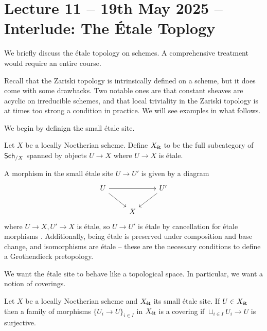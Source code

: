 \section{Lecture 11 -- 19th May 2025 -- Interlude: The \'{E}tale Toplogy}\label{sec: lecture 11}
We briefly discuss the \'{e}tale topology on schemes. A comprehensive treatment would require an entire course. 

Recall that the Zariski topology is intrinsically defined on a scheme, but it does come with some drawbacks. Two notable ones are that constant sheaves are acyclic on irreducible schemes, and that local triviality in the Zariski topology is at times too strong a condition in practice. We will see examples in what follows. 

We begin by definign the small \'{e}tale site. 
\begin{definition}\label{def: small etale site}
    Let $X$ be a locally Noetherian scheme. Define $X_{\mathsf{\acute{e}t}}$ to be the full subcategory of $\mathsf{Sch}_{/X}$ spanned by objects $U\to X$ where $U\to X$ is \'{e}tale. 
\end{definition}
\begin{remark}
    A morphism in the small \'{e}tale site $U\to U'$ is given by a diagram 
    $$%
    \begin{tikzcd}
        U && {U'} \\
        & X
        \arrow[from=1-1, to=1-3]
        \arrow[from=1-1, to=2-2]
        \arrow[from=1-3, to=2-2]
    \end{tikzcd}$$
    where $U\to X,U'\to X$ is \'{e}tale, so $U\to U'$ is \'{e}tale by cancellation for \'{e}tale morphisms \cite[\href{https://stacks.math.columbia.edu/tag/02GW}{Tag 02GW}]{stacks-project}. Additionally, being \'{e}tale is preserved under composition and base change, and isomorphisms are \'{e}tale -- these are the necessary conditions to define a Grothendieck pretopology. 
\end{remark}
We want the \'{e}tale site to behave like a topological space. In particular, we want a notion of coverings. 
\begin{definition}\label{def: etale covering}
    Let $X$ be a locally Noetherian scheme and $X_{\mathsf{\acute{e}t}}$ its small \'{e}tale site. If $U\in X_{\mathsf{\acute{e}t}}$ then a family of morphisms $\{U_{i}\to U\}_{i\in I}$ in $X_{\mathsf{\acute{e}t}}$ is a covering if $\sqcup_{i\in I}U_{i}\to U$ is surjective. 
\end{definition}
